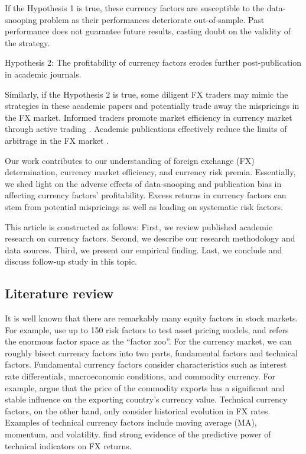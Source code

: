 \documentclass[12pt,a4paper]{article}
\begin{document}
If the Hypothesis 1 is true, these currency factors are susceptible to the data-snooping problem 
as their performances deteriorate out-of-sample. Past performance does not guarantee future results,
casting doubt on the validity of the strategy.	

 
\begin{basedescript}{\desclabelstyle{\pushlabel}\desclabelwidth{7em}}
	\item[Hypothesis 2:]
	The profitability of currency factors erodes further post-publication in academic journals.
\end{basedescript}
 
Similarly, if the Hypothesis 2 is true, some diligent FX traders may
mimic the strategies in these academic papers and potentially trade away the mispricings in the FX market.
Informed traders promote market efficiency in currency market through active trading \citet*{Ross1976}. 
Academic publications effectively reduce the limits of arbitrage in the FX market \citep*{SV1997, MP2016}.

Our work contributes to our understanding of foreign exchange (FX) determination, currency market efficiency,
and currency risk premia. Essentially, we shed light on the adverse effects of data-snooping and publication bias in affecting currency factors' profitability.
Excess returns in currency factors can stem from potential mispricings as well as loading on systematic risk factors.


This article is constructed as follows: First, we review published academic
research on currency factors. Second, we describe our research methodology and
data sources. Third, we present our empirical finding. Last, we conclude and discuss follow-up study in this topic.


\subsection{Literature review}

It is well known that there are remarkably many equity factors in stock markets. For
example, \citet*{HLZ2020} use up to 150 risk factors to test asset pricing models,
and \citet*{COCH2011} refers the enormous factor space as the “factor zoo”. For the currency market, we can roughly bisect
currency factors into two parts, fundamental factors and technical factors. Fundamental currency
factors consider characteristics such as interest rate differentials, macroeconomic conditions,
and commodity currency. For example, \citet*{CR2003} argue that the price of the
commodity exports has a significant and stable influence on the exporting country’s currency
value. Technical currency factors, on the other hand, only consider historical evolution in FX rates. Examples
of technical currency factors include moving average (MA), momentum, and volatility. \citet*{HTZ2016} find strong evidence of the predictive power of technical indicators
on FX returns.
\end{document}
